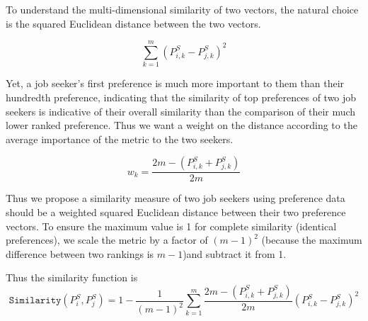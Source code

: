 To understand the multi-dimensional similarity of two vectors, the natural choice is the squared Euclidean distance between the two vectors. 

\[\sum_{k=1}^{m} (P^S_{i,k} - P^S_{j,k})^2\]

Yet, a job seeker's first preference is much more important to them than their hundredth preference, indicating that the similarity of top preferences of two job seekers is indicative of their overall similarity than the comparison of their much lower ranked preference.  Thus we want a weight on the distance according to the average importance of the metric to the two seekers.

\[w_k = \frac{2m - (P^S_{i,k} + P^S_{j,k})}{2m}\]


Thus we propose a similarity measure of two job seekers using preference data should be a weighted squared Euclidean distance between their two preference vectors. To ensure the maximum value is 1 for complete similarity (identical preferences), we scale the metric by a factor of $(m-1)^2$ (because the maximum difference between two rankings is $m-1$)and subtract it from 1.

Thus the similarity function is
\[\texttt{Similarity}(P^S_i, P^S_j) = 1 - \frac{1}{(m-1)^2}\sum_{k=1}^{m} \frac{2m - (P^S_{i,k} + P^S_{j,k})}{2m}(P^S_{i,k} - P^S_{j,k})^2\]